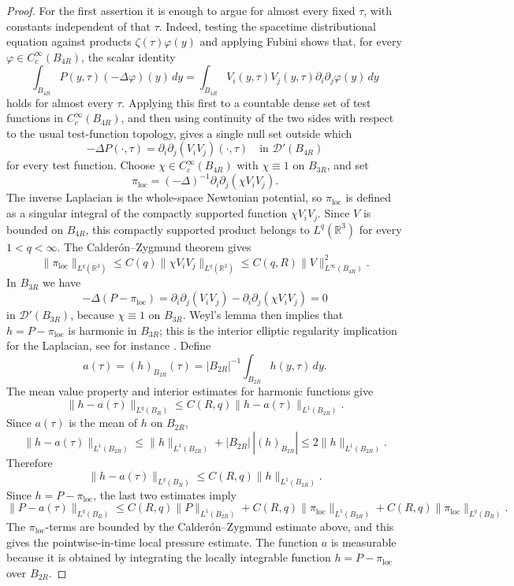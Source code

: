 \documentclass[11pt]{amsart}
\theoremstyle{plain}
\theoremstyle{definition}
\theoremstyle{remark}
\numberwithin{equation}{section}
\begin{document}
\begin{proof}
For the first assertion it is enough to argue for almost every fixed
\(\tau\), with constants independent of that \(\tau\).  Indeed, testing the
spacetime distributional equation against products
\(\zeta(\tau)\varphi(y)\) and applying Fubini shows that, for every
\(\varphi\in C_c^\infty(B_{4R})\), the scalar identity
\[
   \int_{B_{4R}}P(y,\tau)(-\Delta\varphi)(y)\,dy
   =
   \int_{B_{4R}}V_i(y,\tau)V_j(y,\tau)\partial_i\partial_j\varphi(y)\,dy
\]
holds for almost every \(\tau\).  Applying this first to a countable dense
set of test functions in \(C_c^\infty(B_{4R})\), and then using continuity of
the two sides with respect to the usual test-function topology, gives a
single null set outside which
\[
   -\Delta P(\cdot,\tau)
   =
   \partial_i\partial_j(V_iV_j)(\cdot,\tau)
   \quad\text{in }\mathcal D'(B_{4R})
\]
for every test function.  Choose
\(\chi\in C_c^\infty(B_{4R})\) with \(\chi\equiv1\) on \(B_{3R}\), and set
\[
   \pi_{\mathrm{loc}}
   =
   (-\Delta)^{-1}\partial_i\partial_j(\chi V_iV_j).
\]
The inverse Laplacian is the whole-space Newtonian potential, so
\(\pi_{\mathrm{loc}}\) is defined as a singular integral of the compactly
supported function
\(\chi V_iV_j\).  Since \(V\) is bounded on \(B_{4R}\), this compactly
supported product belongs to \(L^q(\mathbb R^3)\) for every
\(1<q<\infty\).  The Calder\'on--Zygmund theorem \cite{Stein1970} gives
\[
   \|\pi_{\mathrm{loc}}\|_{L^q(\mathbb R^3)}
   \le C(q)\|\chi V_iV_j\|_{L^q(\mathbb R^3)}
   \le C(q,R)\|V\|_{L^\infty(B_{4R})}^2 .
\]
In \(B_{3R}\) we have
\[
   -\Delta(P-\pi_{\mathrm{loc}})
   =
   \partial_i\partial_j(V_iV_j)-\partial_i\partial_j(\chi V_iV_j)=0
\]
in \(\mathcal D'(B_{3R})\), because \(\chi\equiv1\) on \(B_{3R}\).  Weyl's lemma then
implies that \(h=P-\pi_{\mathrm{loc}}\) is harmonic in \(B_{3R}\); this is
the interior elliptic regularity implication for the Laplacian, see for
instance \cite{GilbargTrudinger2001}.  Define
\[
   a(\tau)=(h)_{B_{2R}}(\tau)
   =|B_{2R}|^{-1}\int_{B_{2R}}h(y,\tau)\,dy .
\]
The mean value property and interior estimates for harmonic functions give
\[
   \|h-a(\tau)\|_{L^q(B_R)}
   \le C(R,q)\|h-a(\tau)\|_{L^1(B_{2R})}.
\]
Since \(a(\tau)\) is the mean of \(h\) on \(B_{2R}\),
\[
   \|h-a(\tau)\|_{L^1(B_{2R})}
   \le
   \|h\|_{L^1(B_{2R})}
   +|B_{2R}|\, |(h)_{B_{2R}}|
   \le 2\|h\|_{L^1(B_{2R})}.
\]
Therefore
\[
   \|h-a(\tau)\|_{L^q(B_R)}
   \le C(R,q)\|h\|_{L^1(B_{2R})}.
\]
Since \(h=P-\pi_{\mathrm{loc}}\), the last two estimates imply
\[
   \|P-a(\tau)\|_{L^q(B_R)}
   \le C(R,q)\|P\|_{L^1(B_{2R})}
      +C(R,q)\|\pi_{\mathrm{loc}}\|_{L^1(B_{2R})}
      +C(R,q)\|\pi_{\mathrm{loc}}\|_{L^q(B_R)} .
\]
The \(\pi_{\mathrm{loc}}\)-terms are bounded by the Calder\'on--Zygmund
estimate above, and this gives the pointwise-in-time local pressure estimate.
The function \(a\) is measurable because it is obtained by integrating the
locally integrable function \(h=P-\pi_{\mathrm{loc}}\) over \(B_{2R}\).


\end{proof}
\end{document}
